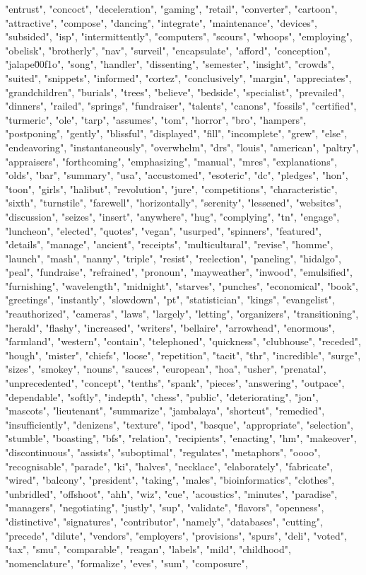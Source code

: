 "entrust", "concoct", "deceleration", "gaming", "retail", "converter", "cartoon", "attractive", "compose", "dancing", "integrate", "maintenance", "devices", "subsided", "isp", "intermittently", "computers", "scours", "whoops", "employing", "obelisk", "brotherly", "nav", "surveil", "encapsulate", "afford", "conception", "jalape\u00f1o", "song", "handler", "dissenting", "semester", "insight", "crowds", "suited", "snippets", "informed", "cortez", "conclusively", "margin", "appreciates", "grandchildren", "burials", "trees", "believe", "bedside", "specialist", "prevailed", "dinners", "railed", "springs", "fundraiser", "talents", "canons", "fossils", "certified", "turmeric", "ole", "tarp", "assumes", "tom", "horror", "bro", "hampers", "postponing", "gently", "blissful", "displayed", "fill", "incomplete", "grew", "else", "endeavoring", "instantaneously", "overwhelm", "drs", "louis", "american", "paltry", "appraisers", "forthcoming", "emphasizing", "manual", "mres", "explanations", "olds", "bar", "summary", "usa", "accustomed", "esoteric", "dc", "pledges", "hon", "toon", "girls", "halibut", "revolution", "jure", "competitions", "characteristic", "sixth", "turnstile", "farewell", "horizontally", "serenity", "lessened", "websites", "discussion", "seizes", "insert", "anywhere", "hug", "complying", "tn", "engage", "luncheon", "elected", "quotes", "vegan", "usurped", "spinners", "featured", "details", "manage", "ancient", "receipts", "multicultural", "revise", "homme", "launch", "mash", "nanny", "triple", "resist", "reelection", "paneling", "hidalgo", "peal", "fundraise", "refrained", "pronoun", "mayweather", "inwood", "emulsified", "furnishing", "wavelength", "midnight", "starves", "punches", "economical", "book", "greetings", "instantly", "slowdown", "pt", "statistician", "kings", "evangelist", "reauthorized", "cameras", "laws", "largely", "letting", "organizers", "transitioning", "herald", "flashy", "increased", "writers", "bellaire", "arrowhead", "enormous", "farmland", "western", "contain", "telephoned", "quickness", "clubhouse", "receded", "hough", "mister", "chiefs", "loose", "repetition", "tacit", "thr", "incredible", "surge", "sizes", "smokey", "nouns", "sauces", "european", "hoa", "usher", "prenatal", "unprecedented", "concept", "tenths", "spank", "pieces", "answering", "outpace", "dependable", "softly", "indepth", "chess", "public", "deteriorating", "jon", "mascots", "lieutenant", "summarize", "jambalaya", "shortcut", "remedied", "insufficiently", "denizens", "texture", "ipod", "basque", "appropriate", "selection", "stumble", "boasting", "bfs", "relation", "recipients", "enacting", "hm", "makeover", "discontinuous", "assists", "suboptimal", "regulates", "metaphors", "oooo", "recognisable", "parade", "ki", "halves", "necklace", "elaborately", "fabricate", "wired", "balcony", "president", "taking", "males", "bioinformatics", "clothes", "unbridled", "offshoot", "ahh", "wiz", "cue", "acoustics", "minutes", "paradise", "managers", "negotiating", "justly", "sup", "validate", "flavors", "openness", "distinctive", "signatures", "contributor", "namely", "databases", "cutting", "precede", "dilute", "vendors", "employers", "provisions", "spurs", "deli", "voted", "tax", "smu", "comparable", "reagan", "labels", "mild", "childhood", "nomenclature", "formalize", "eves", "sum", "composure", 